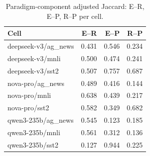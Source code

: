 \begin{table}[t]
\centering
\caption{Paradigm-component adjusted Jaccard: E--R, E--P, R--P per cell.}
\label{tab:paradigms}
\begin{tabular}{lrrr}
\toprule
Cell & E--R & E--P & R--P \\
\midrule
deepseek-v3/ag_news & 0.431 & 0.546 & 0.234 \\
deepseek-v3/mnli & 0.500 & 0.474 & 0.241 \\
deepseek-v3/sst2 & 0.507 & 0.757 & 0.687 \\
nova-pro/ag_news & 0.489 & 0.416 & 0.144 \\
nova-pro/mnli & 0.638 & 0.439 & 0.217 \\
nova-pro/sst2 & 0.582 & 0.349 & 0.682 \\
qwen3-235b/ag_news & 0.545 & 0.123 & 0.185 \\
qwen3-235b/mnli & 0.561 & 0.312 & 0.136 \\
qwen3-235b/sst2 & 0.127 & 0.944 & 0.225 \\
\bottomrule
\end{tabular}
\end{table}
